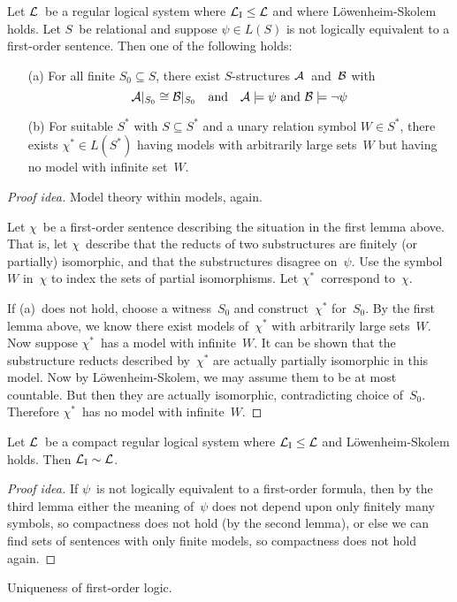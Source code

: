 \begin{lem}
Let \(\mathcal{L}\)~be a regular logical system where \(\mathcal{L}_{\mathrm{I}}\le\mathcal{L}\) and where L\"owenheim-Skolem holds. Let \(S\)~be relational and suppose \(\psi\in L(S)\) is not logically equivalent to a first-order sentence. Then one of the following holds:
\begin{enumerate}[itemsep=0pt]
\item[(a)] For all finite \(S_0\subseteq S\), there exist \(S\)-structures \(\mathcal{A}\)~and~\(\mathcal{B}\) with
\[\mathcal{A}|_{S_0}\cong\mathcal{B}|_{S_0}\quad\text{and}\quad\mathcal{A}\models\psi\text{ and }\mathcal{B}\models\lnot\psi\]
\item[(b)] For suitable \(S^*\) with \(S\subseteq S^*\) and a unary relation symbol \(W\in S^*\), there exists \(\chi^*\in L(S^*)\) having models with arbitrarily large sets~\(W\) but having no model with infinite set~\(W\).
\end{enumerate}
\end{lem}
\begin{proof}[Proof idea]
Model theory within models, again.

Let \(\chi\)~be a first-order sentence describing the situation in the first lemma above. That is, let \(\chi\)~describe that the reducts of two substructures are finitely (or partially) isomorphic, and that the substructures disagree on~\(\psi\). Use the symbol~\(W\) in~\(\chi\) to index the sets of partial isomorphisms. Let \(\chi^*\)~correspond to~\(\chi\).

If (a)~does not hold, choose a witness~\(S_0\) and construct~\(\chi^*\) for~\(S_0\). By the first lemma above, we know there exist models of~\(\chi^*\) with arbitrarily large sets~\(W\). Now suppose \(\chi^*\)~has a model with infinite~\(W\). It can be shown that the substructure reducts described by~\(\chi^*\) are actually partially isomorphic in this model. Now by L\"owenheim-Skolem, we may assume them to be at most countable. But then they are actually isomorphic, contradicting choice of~\(S_0\). Therefore \(\chi^*\)~has no model with infinite~\(W\).
\end{proof}

\begin{thm}
Let \(\mathcal{L}\)~be a compact regular logical system where \(\mathcal{L}_{\mathrm{I}}\le\mathcal{L}\) and L\"owenheim-Skolem holds. Then \(\mathcal{L}_{\mathrm{I}}\sim\mathcal{L}\).
\end{thm}
\begin{proof}[Proof idea]
If \(\psi\)~is not logically equivalent to a first-order formula, then by the third lemma either the meaning of~\(\psi\) does not depend upon only finitely many symbols, so compactness does not hold (by the second lemma), or else we can find sets of sentences with only finite models, so compactness does not hold again.
\end{proof}
\begin{app}
Uniqueness of first-order logic.
\end{app}

